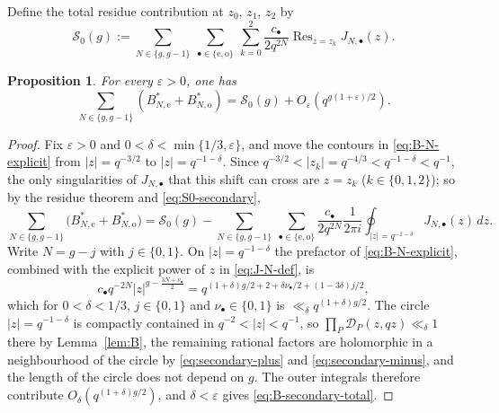 \documentclass[a4paper,reqno]{amsart}
\numberwithin{equation}{section}
\newtheorem{proposition}[theorem]{Proposition}
\theoremstyle{remark}
\theoremstyle{definition}
\begin{document}
Define the total residue contribution at $z_0$, $z_1$, $z_2$ by
\begin{equation}\label{eq:S0-secondary}
\mathcal S_0(g)
:=
\sum_{N\in\{g,g-1\}}
\ \sum_{\bullet\in\{\mathrm e,\mathrm o\}}
\ \sum_{k=0}^2
\frac{c_\bullet}{2q^{2N}}
\operatorname{Res}_{z=z_k}J_{N,\bullet}(z).
\end{equation}

\begin{proposition}
\label{prop:secondary-contour}
For every $\varepsilon>0$, one has
\begin{equation}\label{eq:B-secondary-total}
\sum_{N\in\{g,g-1\}}
\left(
B_{N,\mathrm e}^{*}
+
B_{N,\mathrm o}^{*}
\right)
=
\mathcal S_0(g)
+
O_\varepsilon\!\left(q^{g(1+\varepsilon)/2}\right).
\end{equation}
\end{proposition}

\begin{proof}
Fix $\varepsilon>0$ and $0<\delta<\min\{1/3,\varepsilon\}$, and move the
contours in \eqref{eq:B-N-explicit} from $|z|=q^{-3/2}$ to
$|z|=q^{-1-\delta}$. Since
$q^{-3/2}<|z_k|=q^{-4/3}<q^{-1-\delta}<q^{-1}$, the only singularities of
$J_{N,\bullet}$ that this shift can cross are $z=z_k$ ($k\in\{0,1,2\}$); so by the
residue theorem and \eqref{eq:S0-secondary},
$$
\sum_{N\in\{g,g-1\}}\bigl(B_{N,\mathrm e}^{*}+B_{N,\mathrm o}^{*}\bigr)
=\mathcal S_0(g)
-\sum_{N\in\{g,g-1\}}\ \sum_{\bullet\in\{\mathrm e,\mathrm o\}}
\frac{c_\bullet}{2q^{2N}}\frac{1}{2\pi i}
\oint_{|z|=q^{-1-\delta}}J_{N,\bullet}(z)\,dz.
$$
Write $N=g-j$ with $j\in\{0,1\}$. On $|z|=q^{-1-\delta}$ the prefactor of
\eqref{eq:B-N-explicit}, combined with the explicit power of $z$ in
\eqref{eq:J-N-def}, is
$$
c_\bullet q^{-2N}|z|^{g-\frac{3N+\nu_\bullet}{2}}
=q^{(1+\delta)g/2+2+\delta\nu_\bullet/2+(1-3\delta)j/2},
$$
which for $0<\delta<1/3$, $j\in\{0,1\}$ and $\nu_\bullet\in\{0,1\}$ is
$\ll_\delta q^{(1+\delta)g/2}$. The circle $|z|=q^{-1-\delta}$ is
compactly contained in $q^{-2}<|z|<q^{-1}$, so
$\prod_{P}\mathcal D_P(z,qz)\ll_\delta1$ there by Lemma~\ref{lem:B}, the
remaining rational factors are holomorphic in a neighbourhood of the circle
by \eqref{eq:secondary-plus} and \eqref{eq:secondary-minus}, and the length
of the circle does not depend on $g$. The outer integrals therefore
contribute $O_\delta(q^{(1+\delta)g/2})$, and $\delta<\varepsilon$
gives \eqref{eq:B-secondary-total}.
\end{proof}

\end{document}
